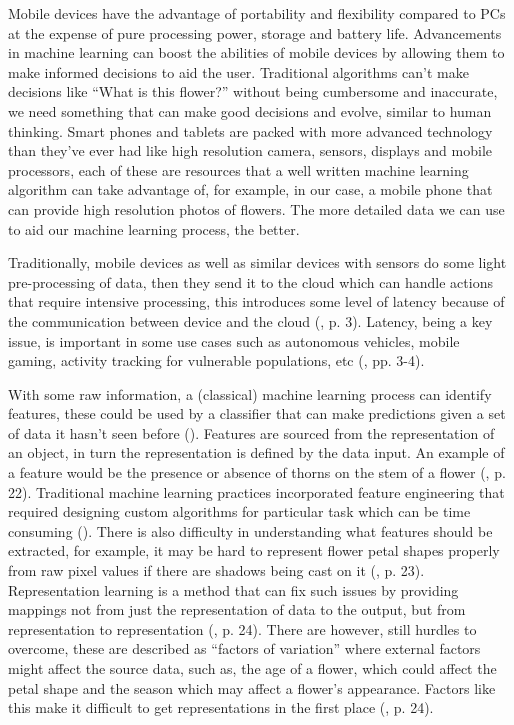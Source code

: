 \documentclass{article}
\begin{document}
\par

Mobile devices have the advantage of portability and flexibility compared to PCs at the expense of pure processing 
power, storage and battery life. Advancements in machine learning can boost the abilities of mobile devices by allowing 
them to make informed decisions to aid the user. Traditional algorithms can't make decisions like “What is this flower?”
without being cumbersome and inaccurate, we need something that can make good decisions and evolve, similar to human 
thinking. Smart phones and tablets are packed with more advanced technology than they've ever had like high resolution 
camera, sensors, displays and mobile processors, each of these are resources that a well written machine learning 
algorithm can take advantage of, for example, in our case, a mobile phone that can provide high resolution photos of 
flowers. The more detailed data we can use to aid our machine learning process, the better. 

\par

Traditionally, mobile devices as well as similar devices with sensors do some light pre-processing of data, then they 
send it to the cloud which can handle actions that require intensive processing, this introduces some level of latency 
because of the communication between device and the cloud (\cite{olascoaga2021hardware}, p. 3). 
Latency, being a key issue, is important in some use cases such as autonomous vehicles, mobile gaming, activity tracking
for vulnerable populations, etc (\cite{olascoaga2021hardware}, pp. 3-4).


\par

With some raw information, a (classical) machine learning process can identify features, these could be used by a 
classifier that can make predictions given a set of data it hasn't seen before (\cite{lecun2015deep}). Features are 
sourced from the representation of an object, in turn the representation is defined by the 
data input. An example of a feature would be the presence or absence of thorns on the stem of a flower 
(\cite{goodfellow2016deep}, p. 22). Traditional machine learning practices incorporated 
feature engineering that required designing custom algorithms for particular task which can be time consuming 
(\cite{liu2020representation}). There is also difficulty in understanding what features should be extracted, 
for example, it may be hard to represent flower petal shapes properly from raw pixel values if there are shadows being 
cast on it (\cite{goodfellow2016deep}, p. 23). Representation learning is a method that 
can fix such issues by providing mappings not from just the representation of data to the output, but from 
representation to representation (\cite{goodfellow2016deep}, p. 24). There are however, 
still hurdles to overcome, these are described as “factors of variation” where external factors might affect the source 
data, such as, the age of a flower, which could affect the petal shape and the season which may affect a flower's 
appearance. Factors like this make it difficult to get representations in the first place 
(\cite{goodfellow2016deep}, p. 24).
\end{document}

